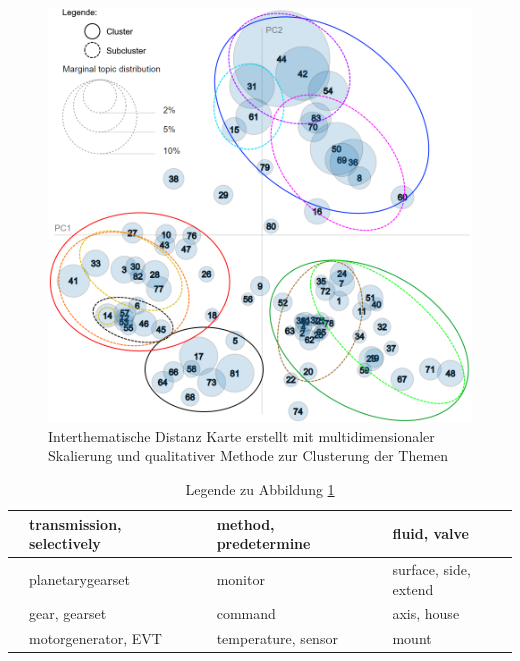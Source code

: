  
 \begin{figure}[H]
 	\centering
 	\includegraphics[width=\textwidth,keepaspectratio=true]{img/LDAvisGM-3-1-1_clustered_small.png}
 	\caption{
 		Interthematische Distanz Karte erstellt mit multidimensionaler Skalierung und qualitativer Methode zur Clusterung der Themen
 	}
 	\label{fig:Themengruppen_LDA_Unigramm}
 \end{figure}

\begin{table}[H]
	\centering
	\caption{Legende zu Abbildung \ref{fig:Themengruppen_LDA_Unigramm}}
	\label{table:Legend}
	\begin{tabular}{|l|l|l|l|l|l|}
		\hline
		\cellcolor{blue}& transmission, selectively & \cellcolor{red} & method, predetermine & \cellcolor{black} & fluid, valve \\
		\hline
		\cellcolor{violet}& planetarygearset & \cellcolor{orange} & monitor & \cellcolor{OliveGreen} & surface, side, extend \\
		\hline
		\cellcolor{pink}& gear, gearset  & \cellcolor{yellow} & command & \cellcolor{green} & axis, house \\
		\hline
		\cellcolor{teal}& motorgenerator, EVT & \cellcolor{gray} & temperature, sensor & \cellcolor{brown} & mount \\
		\hline
	\end{tabular}
\end{table}

